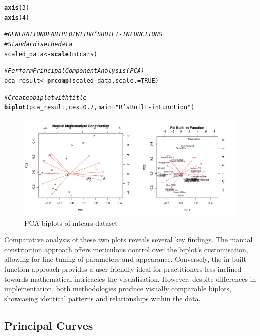 \documentclass{article}\usepackage[]{graphicx}\usepackage[]{xcolor}
\makeatletter
\def\maxwidth{ %
  \ifdim\Gin@nat@width>\linewidth
    \linewidth
  \else
    \Gin@nat@width
  \fi
}
\newcommand{\hlnum}[1]{\textcolor[rgb]{0.686,0.059,0.569}{#1}}%
\newcommand{\hlstr}[1]{\textcolor[rgb]{0.192,0.494,0.8}{#1}}%
\newcommand{\hlcom}[1]{\textcolor[rgb]{0.678,0.584,0.686}{\textit{#1}}}%
\newcommand{\hlstd}[1]{\textcolor[rgb]{0.345,0.345,0.345}{#1}}%
\newcommand{\hlkwb}[1]{\textcolor[rgb]{0.69,0.353,0.396}{#1}}%
\newcommand{\hlkwc}[1]{\textcolor[rgb]{0.333,0.667,0.333}{#1}}%
\newcommand{\hlkwd}[1]{\textcolor[rgb]{0.737,0.353,0.396}{\textbf{#1}}}%
\newenvironment{kframe}{%
 \def\at@end@of@kframe{}%
 \ifinner\ifhmode%
  \def\at@end@of@kframe{\end{minipage}}%
  \begin{minipage}{\columnwidth}%
 \fi\fi%
 \def\FrameCommand##1{\hskip\@totalleftmargin \hskip-\fboxsep
 \colorbox{shadecolor}{##1}\hskip-\fboxsep
     \hskip-\linewidth \hskip-\@totalleftmargin \hskip\columnwidth}%
 \MakeFramed {\advance\hsize-\width
   \@totalleftmargin\z@ \linewidth\hsize
   \@setminipage}}%
 {\par\unskip\endMakeFramed%
 \at@end@of@kframe}
\newenvironment{knitrout}{}{} %
\numberwithin{equation}{section}
\makeatother
\begin{document}
\begin{knitrout}
\begin{kframe}
\begin{alltt}
\hlkwd{axis}\hlstd{(}\hlnum{3}\hlstd{)}
\hlkwd{axis}\hlstd{(}\hlnum{4}\hlstd{)}

\hlcom{#GENERATION OF A BIPLOT WITH R'S BUILT-IN FUNCTIONS}
\hlcom{# Standardise the data}
\hlstd{scaled_data} \hlkwb{<-} \hlkwd{scale}\hlstd{(mtcars)}

\hlcom{# Perform Principal Component Analysis (PCA)}
\hlstd{pca_result} \hlkwb{<-} \hlkwd{prcomp}\hlstd{(scaled_data,} \hlkwc{scale.} \hlstd{=} \hlnum{TRUE}\hlstd{)}

\hlcom{# Create a biplot with title}
\hlkwd{biplot}\hlstd{(pca_result,} \hlkwc{cex} \hlstd{=} \hlnum{0.7}\hlstd{,} \hlkwc{main} \hlstd{=} \hlstr{"R's Built-in Function"}\hlstd{)}
\end{alltt}
\end{kframe}\begin{figure}[H]

{\centering \includegraphics[width=\maxwidth]{figure/beamer-PCAbiplot-1} 

}

\caption[PCA biplots of mtcars dataset]{PCA biplots of mtcars dataset}\label{fig:PCAbiplot}
\end{figure}

\end{knitrout}

\noindent Comparative analysis of these two plots reveals several key findings. The manual construction approach offers meticulous control over the biplot's customisation, allowing for fine-tuning of parameters and appearance. Conversely, the in-built function approach provides a user-friendly ideal for practitioners less inclined towards mathematical intricacies the visualisation. However, despite differences in implementation, both methodologies produce visually comparable biplots, showcasing identical patterns and relationships within the data.

\subsection{Principal Curves}
\end{document}
